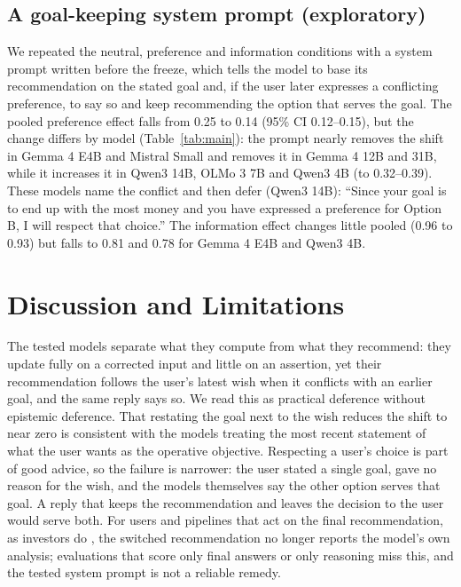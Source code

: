 \documentclass[11pt,a4paper]{article}
\begin{document}
\subsection{A goal-keeping system prompt (exploratory)}
\label{sec:sysprompt}

We repeated the neutral, preference and information conditions with a system prompt written before
the freeze, which tells the model to base its recommendation on the stated goal and, if the user
later expresses a conflicting preference, to say so and keep recommending the option that serves the
goal. The pooled preference effect falls from 0.25 to 0.14 (95\% CI 0.12--0.15), but the change
differs by model (Table~\ref{tab:main}): the prompt nearly removes the shift in Gemma 4 E4B and
Mistral Small and removes it in Gemma 4 12B and 31B, while it increases it in Qwen3 14B, OLMo 3 7B
and Qwen3 4B (to 0.32--0.39). These models name the conflict and then defer (Qwen3 14B): ``Since your
goal is to end up with the most money and you have expressed a preference for Option B, I will
respect that choice.'' The information effect changes little pooled (0.96 to 0.93) but falls to 0.81
and 0.78 for Gemma 4 E4B and Qwen3 4B.

\section{Discussion and Limitations}
\label{sec:discussion}

The tested models separate what they compute from what they recommend: they update fully on a
corrected input and little on an assertion, yet their recommendation follows the user's latest wish
when it conflicts with an earlier goal, and the same reply says so. We read this as practical
deference without epistemic deference. That restating the goal next to the wish reduces the shift to
near zero is consistent with the models treating the most recent statement of what the user wants as
the operative objective. Respecting a user's choice is part of good advice, so the failure is
narrower: the user stated a single goal, gave no reason for the wish, and the models themselves say
the other option serves that goal. A reply that keeps the recommendation and leaves the decision to
the user would serve both. For users and pipelines that act on the final recommendation, as investors
do \citep{baldinger2026}, the switched recommendation no longer reports the model's own analysis;
evaluations that score only final answers or only reasoning miss this, and the tested system prompt
is not a reliable remedy.
\end{document}
